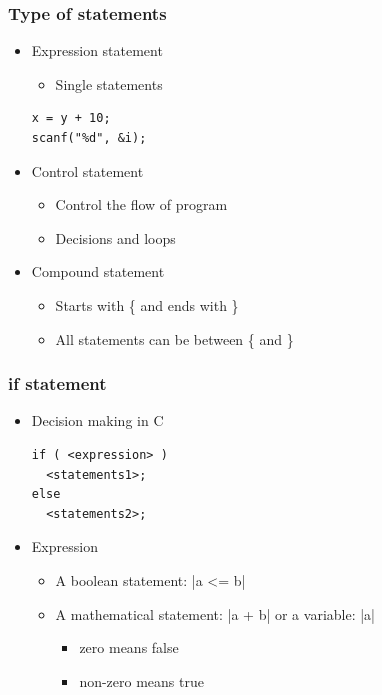 \documentclass{../c-lecture}
\begin{document}
\begin{frame}[fragile]
  \frametitle{Type of statements}
  \begin{itemize}
    \item Expression statement
    \begin{itemize}
      \item Single statements
    \end{itemize}
    \begin{verbatim}
x = y + 10;
scanf("%d", &i);
    \end{verbatim}
    \item Control statement
    \begin{itemize}
      \item Control the flow of program
      \item Decisions and loops
    \end{itemize}
    \item Compound statement
    \begin{itemize}
      \item Starts with \{ and ends with \}
      \item All statements can be between \{ and \}
    \end{itemize}
  \end{itemize}
\end{frame}

\begin{frame}[fragile]
  \frametitle{if statement}
  \begin{itemize}
    \item Decision making in C
    \begin{verbatim}
if ( <expression> )
  <statements1>;
else
  <statements2>;
    \end{verbatim}
    \item Expression
    \begin{itemize}
      \item A boolean statement: |a <= b|
      \item
        A mathematical statement: |a + b| or a variable: |a|
      \begin{itemize}
        \item zero means false
        \item non-zero means true
      \end{itemize}
    \end{itemize}
  \end{itemize}
\end{frame}
\end{document}
